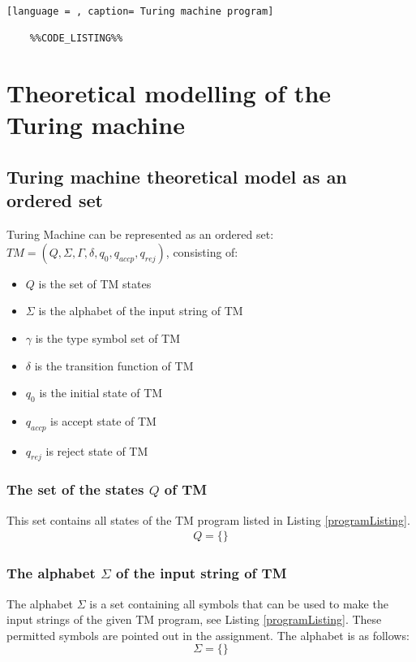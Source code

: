 \documentclass[12pt, a4paper]{report}
\begin{document}
\lstset{style=mystyle}

\begin{lstlisting}[language = , caption= Turing machine program]
	
	%%CODE_LISTING%%

\end{lstlisting} \label{programListing}


\chapter{Theoretical modelling of the Turing machine}


\section[]{Turing machine theoretical model as an ordered set}

Turing Machine can be represented as an ordered set: $ TM = (Q, \Sigma, \Gamma, \delta, q_{0}, q_{accp}, q_{rej}) $, consisting of: 
			\begin{itemize}
				\item $Q$  is the set of TM states
				\item $\Sigma$  is the alphabet of the input string of TM
				\item $\gamma$  is the type symbol set of TM
				\item $\delta$  is the transition function of TM
				\item $q_{0}$ is the initial state of TM
				\item $q_{accp}$ is accept state of TM
				\item $q_{rej}$  is reject state of TM
				\end{itemize}


	\subsection{The set of the states $Q$ of TM}
	This set contains all states of the TM program listed in Listing \ref{programListing}.
		\begin{equation}
		\begin{aligned}
		\label{eq:Q}
			Q = \{ %
			\}
		\end{aligned}
		\end{equation}
	\subsection{The alphabet $ \Sigma $ of the input string of TM}
		The alphabet $ \Sigma $ is a set containing all symbols that can be used to make the input strings of the given TM program, see Listing \ref{programListing}. These permitted symbols are pointed out in the assignment. The alphabet is as follows:
		\begin{equation}
			\Sigma = \{ %
			\}
		\end{equation}
% 
\end{document}
